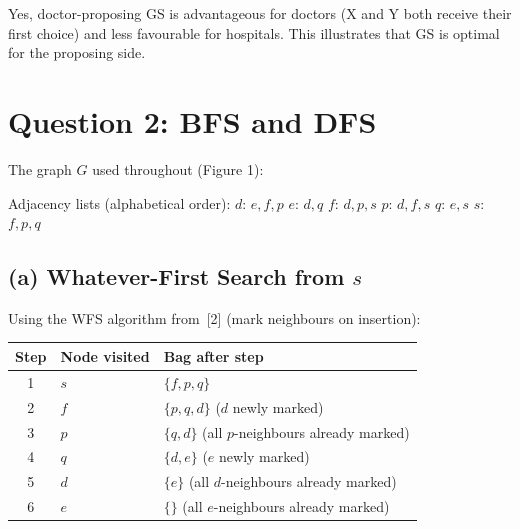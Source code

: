 \documentclass[11pt]{article}
\begin{document}
Yes, doctor-proposing GS is advantageous for doctors (X and Y both receive their first choice) and less favourable for hospitals.  This illustrates that GS is optimal for the proposing side.

\newpage
\section*{Question 2: BFS and DFS}

The graph $G$ used throughout (Figure 1):

\begin{center}
\end{center}

Adjacency lists (alphabetical order):
$d$: $e,f,p$ \quad $e$: $d,q$ \quad $f$: $d,p,s$ \quad $p$: $d,f,s$ \quad $q$: $e,s$ \quad $s$: $f,p,q$

\subsection*{(a) Whatever-First Search from $s$}

Using the WFS algorithm from~[2] (mark neighbours on insertion):

\begin{center}
\begin{tabular}{cll}
\toprule
Step & Node visited & Bag after step \\
\midrule
1 & $s$ & $\{f,p,q\}$ \\
2 & $f$ & $\{p,q,d\}$ \quad ($d$ newly marked) \\
3 & $p$ & $\{q,d\}$ \quad (all $p$-neighbours already marked) \\
4 & $q$ & $\{d,e\}$ \quad ($e$ newly marked) \\
5 & $d$ & $\{e\}$ \quad (all $d$-neighbours already marked) \\
6 & $e$ & $\{\}$ \quad (all $e$-neighbours already marked) \\
\bottomrule
\end{tabular}
\end{center}
\end{document}
